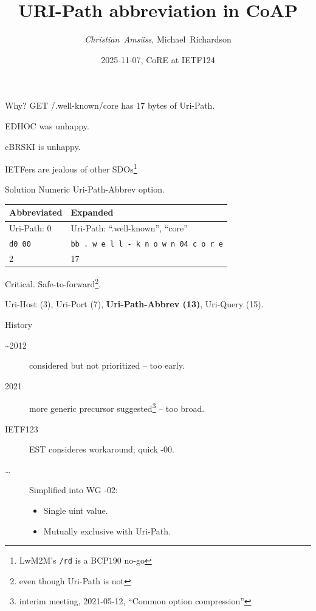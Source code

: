 

\title{URI-Path abbreviation in CoAP}
\subtitle{}
\author{\textit{Christian~Amsüss}, Michael~Richardson}
\date{2025-11-07, CoRE at IETF124}



\frame{\titlepage}

\begin{frame}{Why?}\Large
  GET /.well-known/core has 17 bytes of Uri-Path.

  \bigskip

  EDHOC was unhappy.

  \bigskip

  cBRSKI is unhappy.

  \bigskip

  IETFers are jealous of other SDOs\footnote{LwM2M's \texttt{/rd} is a BCP190 no-go}
\end{frame}

\begin{frame}{Solution}\Large
  Numeric Uri-Path-Abbrev option.

  \bigskip

  \begin{tabular}{l|l}
    Abbreviated & Expanded \\ \hline
    Uri-Path: 0 \hspace{1cm} & Uri-Path: ``.well-known'', ``core'' \\
    \texttt{d0 00} & \texttt{bb . w e l l - k n o w n 04 c o r e} \\
    2 & 17 \\
  \end{tabular}

  \bigskip

  Critical. Safe-to-forward\footnote{even though Uri-Path is not}.

  \bigskip

  Uri-Host (3), Uri-Port (7), \textbf{Uri-Path-Abbrev (13)}, Uri-Query (15).
\end{frame}

\begin{frame}{History}\Large
  \begin{description}
    \item[\textasciitilde 2012] considered but not prioritized  -- too early.
    \item[2021] more generic precursor suggested\footnote{interim meeting, 2021-05-12, ``Common option compression''}  -- too broad.
    \item[IETF123] EST consideres workaround; quick -00.

    \item[\ldots] Simplified into WG -02:
      \begin{itemize}
        \item Single uint value.
        \item Mutually exclusive with Uri-Path.
      \end{itemize}
  \end{description}
\end{frame}

